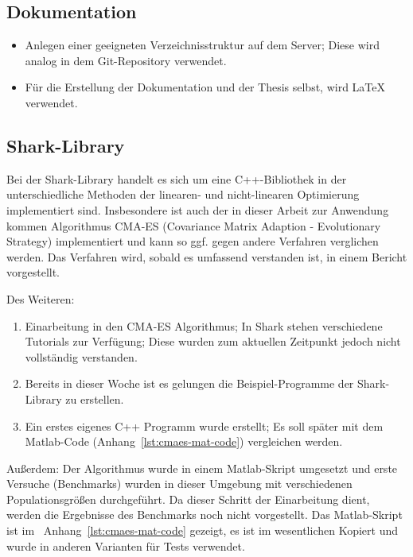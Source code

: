 \documentclass[a4paper,12pt,fleqn]{article}
\begin{document}
\subsection{Dokumentation}
\begin{itemize}
  \item Anlegen einer geeigneten Verzeichnisstruktur auf dem Server; Diese wird analog in dem Git-Repository verwendet.
  \item Für die Erstellung der Dokumentation und der Thesis selbst, wird
      \LaTeX{} verwendet.

\end{itemize}

\subsection{Shark-Library}
\label{sec:shark}
Bei der Shark-Library \cite{Shark:1} handelt es sich um eine C++-Bibliothek in der unterschiedliche Methoden der linearen- und nicht-linearen Optimierung implementiert sind.
Insbesondere ist auch der in dieser Arbeit zur Anwendung kommen Algorithmus CMA-ES (Covariance Matrix Adaption - Evolutionary Strategy) implementiert und kann so ggf. gegen andere Verfahren verglichen werden.
Das Verfahren wird, sobald es umfassend verstanden ist, in einem Bericht vorgestellt.

Des Weiteren:
\begin{enumerate}
  \item Einarbeitung in den CMA-ES Algorithmus; In Shark stehen verschiedene Tutorials zur Verfügung; Diese wurden zum aktuellen Zeitpunkt jedoch nicht vollständig verstanden.
  \item Bereits in dieser Woche ist es gelungen die Beispiel-Programme der Shark-Library zu erstellen.
  \item Ein erstes eigenes C++ Programm wurde erstellt; Es soll später mit dem Matlab-Code (Anhang~\ref{lst:cmaes-mat-code}) vergleichen werden.

\end{enumerate}

Außerdem:
Der Algorithmus wurde in einem Matlab-Skript umgesetzt und erste Versuche (Benchmarks) wurden in dieser Umgebung mit verschiedenen Populationsgrößen durchgeführt.
Da dieser Schritt der Einarbeitung dient, werden die Ergebnisse des Benchmarks noch nicht vorgestellt.
Das Matlab-Skript ist im \ Anhang~\ref{lst:cmaes-mat-code} gezeigt, es ist im wesentlichen Kopiert und wurde in anderen Varianten für Tests verwendet.
\end{document}
